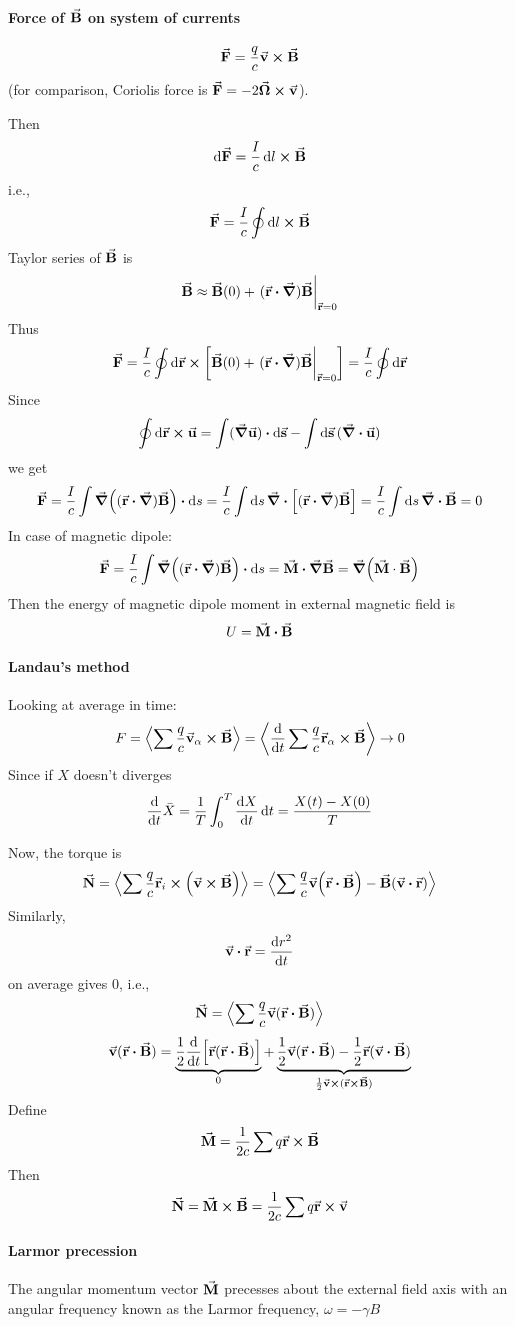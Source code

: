\paragraph{Force of $\va{B}$ on system of currents}
$$\va{F}= \frac{q}{c} \va{v} \cross \va{B}$$
(for comparison, Coriolis force is $\va{F} = -2 \va{\Omega} \cross \va{v}$).

Then
$$\dd{\va{F}} = \frac{I}{c}\dd{l} \cross \va{B}$$
i.e.,
$$\va{F} = \frac{I}{c}\oint \dd{l} \cross \va{B} $$
Taylor series of $\va{B}$ is
$$\va{B} \approx \va{B}(0) + \eval{(\va{r} \vdot \grad)\va{B}}_{\va{r}=0}$$
Thus 
$$\va{F} = \frac{I}{c} \oint \dd{\va{r}} \cross \qty[\va{B}(0) + \eval{(\va{r} \vdot \grad)\va{B}}_{\va{r}=0}] = \frac{I}{c} \oint \dd{\va{r}} $$
Since
$$\oint \dd{\va{r}} \cross \va{u}= \int (\grad \va{u}) \vdot \dd{\va{s}} - \int \dd{\va{s}} (\div{\va{u}}) $$
we get
$$\va{F} = \frac{I}{c} \int \grad((\va{r} \vdot \grad)\va{B})\vdot \dd{s} = \frac{I}{c} \int \dd{s} \div[(\va{r} \vdot \grad)\va{B}] = \frac{I}{c} \int \dd{s} \div{\va{B}} = 0$$
In case of magnetic dipole:
$$\va{F} = \frac{I}{c} \int \grad((\va{r} \vdot \grad)\va{B})\vdot \dd{s} = \va{M} \vdot \grad{\va{B}} = \grad(\va{M} \cdot \va{B})$$
Then the energy of magnetic dipole moment in external magnetic field is
$$U = \va{M} \vdot \va{B}$$
\paragraph{Landau's method}
Looking at average in time:
$$F = \expval{\sum \frac{q}{c}\va{v}_\alpha \cross \va{B}} = \expval{\dv{t} \sum \frac{q}{c}\va{r}_\alpha \cross \va{B}} \to 0$$
Since if $X$ doesn't diverges
$$\dv{t} \bar{X} = \frac{1}{T} \int_0^T \dv{X}{t} \dd{t} = \frac{X(t)-X(0)}{T} $$

Now, the torque is
$$\va{N} = \expval{\sum \frac{q}{c} \va{r}_i \cross \qty(\va{v} \cross \va{B})} = \expval{\sum \frac{q}{c} \va{v} \qty(\va{r}\vdot \va{B}) - \va{B} \qty(\va{v} \vdot \va{r})}$$
Similarly, 
$$\va{v}\vdot \va{r} = \dv{r^2}{t}$$
on average gives $0$, i.e.,
$$\va{N} = \expval{\sum \frac{q}{c} \va{v}(\va{r} \vdot \va{B})}$$
$$\va{v}(\va{r} \vdot \va{B}) = \underbrace{\frac{1}{2} \dv{t}\qty[\va{r}(\va{r} \vdot \va{B})]}_{0} + \underbrace{\frac{1}{2} \va{v}(\va{r} \vdot \va{B}) - \frac{1}{2} \va{r}(\va{v} \vdot \va{B})}_{\frac{1}{2} \va{v}\cross (\va{r} \cross \va{B})}$$
Define
$$\va{M} = \frac{1}{2c} \sum q\va{r} \cross \va{B}$$
Then
$$\va{N}  = \va{M} \cross \va{B} = \frac{1}{2c}\sum q\va{r} \cross \va{v}$$
\paragraph{Larmor precession}
The angular momentum vector $\va{M}$ precesses about the external field axis with an angular frequency known as the Larmor frequency,
$ \omega =-\gamma B$

